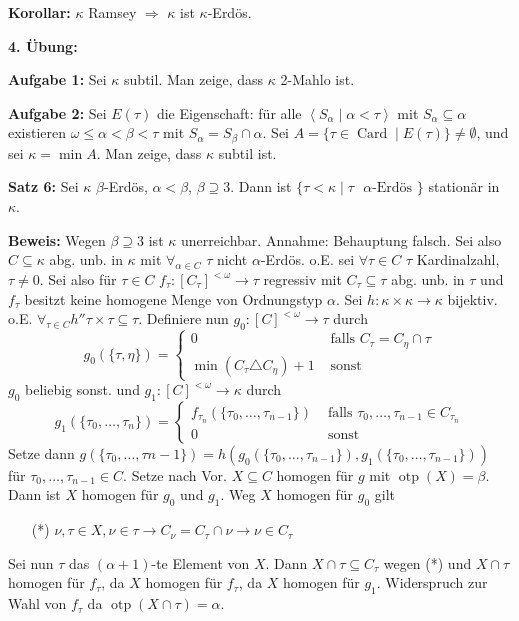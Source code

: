 \documentclass[a4paper,fontsize=11pt]{scrartcl}
\newcommand{\Card}{\operatorname{Card}}
\newcommand{\otp}{\operatorname{otp}}
\begin{document}
{\bf Korollar:} $\kappa$ Ramsey $\Rightarrow$ $\kappa$ ist
$\kappa$-Erdös.

{\bf 4. Übung:}

{\bf Aufgabe 1:} Sei $\kappa$ subtil. Man zeige, dass $\kappa$ 2-Mahlo
ist.

{\bf Aufgabe 2:} Sei $E(\tau)$ die Eigenschaft: für alle
$\left<S_\alpha \mid \alpha < \tau\right>$ mit $S_\alpha \subseteq
\alpha$ existieren $\omega \le \alpha < \beta < \tau$ mit $S_\alpha =
S_\beta \cap \alpha$. Sei $A = \{\tau \in \Card \mid E(\tau)\} \neq
\emptyset$, und sei $\kappa = \min A$. Man zeige, dass $\kappa$ subtil
ist.

{\bf Satz 6:} Sei $\kappa$ $\beta$-Erdös, $\alpha<\beta$, $\beta\supseteq 3$. 
  Dann ist $\{\tau<\kappa\mid\tau\mbox{ $\alpha$-Erdös }\}$ stationär in $\kappa$.

  {\bf Beweis:} Wegen $\beta\supseteq 3$ ist $\kappa$ unerreichbar.
    Annahme: Behauptung falsch.
    Sei also $C\subseteq \kappa$ abg. unb. in $\kappa$ mit $\forall_{\alpha\in C}$ $\tau$ nicht $\alpha$-Erdös.
    o.E. sei $\forall \tau\in C$ $\tau$ Kardinalzahl, $\tau\neq 0$.
    Sei also für $\tau\in C$ $f_{\tau}\colon [C_{\tau}]^{<\omega}\to\tau$ regressiv mit 
    $C_{\tau}\subseteq\tau$ abg. unb. in $\tau$ und $f_{\tau}$ besitzt keine homogene Menge von Ordnungstyp $\alpha$.
    Sei $h\colon \kappa\times\kappa\to\kappa$ bijektiv.
    o.E. $\forall_{\tau\in C} h''\tau\times\tau\subseteq\tau$.
    Definiere nun $g_0\colon [C]^{<\omega}\to\tau$ durch
    \[  g_0(\{\tau,\eta\})= \left\{\begin{array}{cl} 0 & \mbox{ falls }C_{\tau}=C_{\eta}\cap\tau \\ \min(C_{\tau}\triangle C_{\eta})+1 & \mbox{ sonst} \end{array}\right. \]
    $g_0$ beliebig sonst.
    und $g_1\colon [C]^{<\omega}\to\kappa$ durch
    \[ g_1(\{\tau_0,\ldots,\tau_n\})=\left\{\begin{array}{cl} f_{\tau_n}(\{\tau_0,\ldots,\tau_{n-1}\}) &\mbox{ falls }\tau_0,\ldots,\tau_{n-1}\in C_{\tau_n} \\
      0 & \mbox{ sonst}\end{array}\right.\]
    Setze dann $g(\{\tau_0,\ldots,\tau{n-1}\})= h(g_0(\{\tau_0,\ldots,\tau_{n-1}\}), g_1(\{\tau_0,\ldots,\tau_{n-1}\}))$ für $\tau_0,\ldots,\tau_{n-1}\in C$.
    Setze nach Vor. $X\subseteq C$ homogen für $g$ mit $\otp(X)=\beta$.
    Dann ist $X$ homogen für $g_0$ und $g_1$.
    Weg $X$ homogen für $g_0$ gilt
    \begin{itemize}\item[(*)] $\nu, \tau\in X, \nu \in\tau \to C_{\nu}=C_{\tau}\cap\nu\to \nu\in C_{\tau}$\end{itemize}
    Sei nun $\tau$ das $(\alpha+1)$-te Element von $X$.
    Dann $X\cap\tau\subseteq C_{\tau}$ wegen (*) und $X\cap\tau$ homogen für $f_{\tau}$, da $X$ homogen für $f_{\tau}$, da $X$ homogen für $g_1$.
    Widerspruch zur Wahl von $f_{\tau}$ da $\otp(X\cap\tau)=\alpha$.
    
\end{document}
